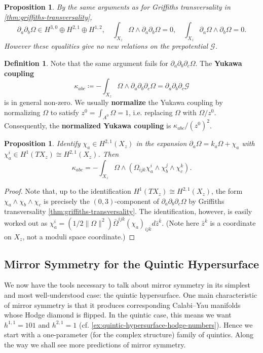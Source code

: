 \documentclass{report}
\theoremstyle{plain}
\newtheorem{proposition}[theorem]{Proposition}
\theoremstyle{definition}
\newtheorem{definition}[theorem]{Definition}
\theoremstyle{remark}
\newcommand{\di}{\partial}
\newcommand{\cG}{\mathcal{G}}
\begin{document}
\begin{proposition}
  By the same arguments as for Griffiths transversality in
  \ref{thm:griffiths-transversality},
  \[ \di_a \di_b \Omega \in H^{3,0} \oplus H^{2,1} \oplus H^{1,2}, \quad \int_{X_z} \Omega \wedge \di_a\di_b\Omega = 0, \quad \int_{X_z} \di_a \Omega \wedge \di_b \Omega = 0. \]
  However these equalities give no new relations on the prepotential
  $\cG$.
\end{proposition}

\begin{definition} \label{def:yukawa-coupling}
  Note that the same argument fails for $\di_a\di_b\di_c\Omega$. The
  {\bf Yukawa coupling}
  \[ \kappa_{abc} \coloneqq -\int_{X_z} \Omega \wedge \di_a\di_b\di_c\Omega = \di_a\di_b\di_c\cG \]
  is in general non-zero. We usually {\bf normalize} the Yukawa
  coupling by normalizing $\Omega$ to satisfy $z^0 = \int_{A^0}\Omega
  = 1$, i.e. replacing $\Omega$ with $\Omega/z^0$. Consequently, the
  {\bf normalized Yukawa coupling} is $\kappa_{abc}/(z^0)^2$.
\end{definition}

\begin{proposition}
  Identify $\chi_a \in H^{2,1}(X_z)$ in the expansion $\di_a\Omega =
  k_a \Omega + \chi_a$ with $\chi_a^i \in H^1(TX_z) \cong
  H^{2,1}(X_z)$. Then
  \[ \kappa_{abc} = -\int_{X_z} \Omega \wedge (\Omega_{ijk} \chi^i_a \wedge \chi^j_b \wedge \chi^k_c). \]
\end{proposition}

\begin{proof}
  Note that, up to the identification $H^1(TX_z) \cong H^{2,1}(X_z)$,
  the form $\chi_a \wedge \chi_b \wedge \chi_c$ is precisely the
  $(0,3)$-component of $\di_a\di_b\di_c\Omega$ by Griffiths
  transversality \ref{thm:griffiths-transversality}. The
  identification, however, is easily worked out as $\chi_a^i =
  (1/2\|\Omega\|^2) \bar{\Omega}^{ijk}(\chi_a)_{ij\bar{k}}
  d\bar{z}^{\bar{k}}$. (Note here $\bar{z}^{\bar{k}}$ is a coordinate
  on $X_z$, not a moduli space coordinate.)
\end{proof}

\subsection{Mirror Symmetry for the Quintic Hypersurface}

We now have the tools necessary to talk about mirror symmetry in its
simplest and most well-understood case: the quintic hypersurface. One
main characteristic of mirror symmetry is that it produces
corresponding Calabi--Yau manifolds whose Hodge diamond is flipped. In
the quintic case, this means we want $h^{1,1} = 101$ and $h^{2,1} = 1$
(cf. \ref{ex:quintic-hypersurface-hodge-numbers}). Hence we start
with a one-parameter (for the complex structure) family of quintics.
Along the way we shall see more predictions of mirror symmetry.
\end{document}
